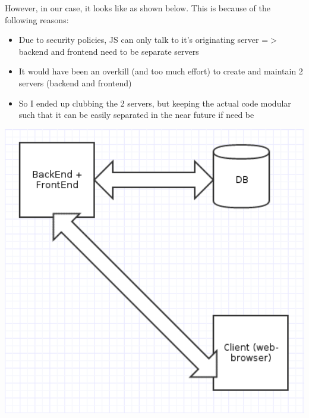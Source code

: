 \documentclass[a4paper, 10pt]{article}
\begin{document}
However, in our case, it looks like as shown below. This is because of the following reasons:

\begin{itemize}
  \item Due to security policies, JS can only talk to it's originating server =$>$ backend and frontend need to be separate servers
  \item It would have been an overkill (and too much effort) to create and maintain 2 servers (backend and frontend)
  \item So I ended up clubbing the 2 servers, but keeping the actual code modular such that it can be easily separated in the near future if need be
\end{itemize}

\includegraphics[width=6in]{implemented.png}
\end{document}
